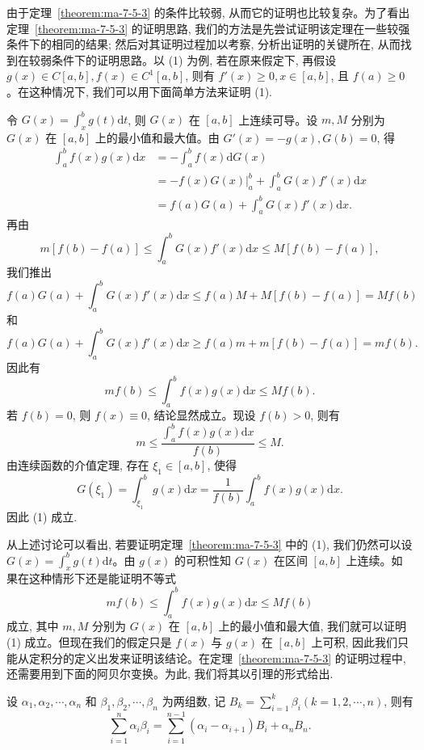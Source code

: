 由于定理~\ref{theorem:ma-7-5-3} 的条件比较弱, 从而它的证明也比较复杂。为了看出定理~\ref{theorem:ma-7-5-3} 的证明思路, 我们的方法是先尝试证明该定理在一些较强条件下的相同的结果; 然后对其证明过程加以考察, 分析出证明的关键所在, 从而找到在较弱条件下的证明思路。以 (1) 为例, 若在原来假定下, 再假设 $g(x)\in C[a,b],f(x)\in C^1[a,b]$, 则有 $f'(x)\geq0,x\in[a,b]$, 且 $f(a)\geq0$。在这种情况下, 我们可以用下面简单方法来证明 (1).

令 $G(x)=\int_x^b g(t)\mathrm dt$, 则 $G(x)$ 在 $[a,b]$ 上连续可导。设 $m,M$ 分别为 $G(x)$ 在 $[a,b]$ 上的最小值和最大值。由 $G'(x)=-g(x),G(b)=0$, 得
\[
\begin{aligned}
  \int_a^b f(x)g(x)\mathrm dx
  &=-\int_a^b f(x)\mathrm dG(x)\\
  &=-\left.f(x)G(x)\right|_a^b+\int_a^b G(x)f'(x)\mathrm dx\\
  &=f(a)G(a)+\int_a^b G(x)f'(x)\mathrm dx.
\end{aligned}
\]
再由
\[
  m[f(b)-f(a)]\leq\int_a^b G(x)f'(x)\mathrm dx\leq M[f(b)-f(a)],
\]
我们推出
\[
  f(a)G(a)+\int_a^b G(x)f'(x)\mathrm dx
  \leq f(a)M+M[f(b)-f(a)]=Mf(b)
\]
和
\[
  f(a)G(a)+\int_a^b G(x)f'(x)\mathrm dx
  \geq f(a)m+m[f(b)-f(a)]=mf(b).
\]
因此有
\[
  mf(b)\leq\int_a^b f(x)g(x)\mathrm dx\leq Mf(b).
\]
若 $f(b)=0$, 则 $f(x)\equiv0$, 结论显然成立。现设 $f(b)>0$, 则有
\[
  m\leq\frac{\int_a^b f(x)g(x)\mathrm dx}{f(b)}\leq M.
\]
由连续函数的介值定理, 存在 $\xi_1\in[a,b]$, 使得
\[
  G(\xi_1)=\int_{\xi_1}^b g(x)\mathrm dx
  =\frac{1}{f(b)}\int_a^b f(x)g(x)\mathrm dx.
\]
因此 (1) 成立.

从上述讨论可以看出, 若要证明定理~\ref{theorem:ma-7-5-3} 中的 (1), 我们仍然可以设 $G(x)=\int_x^b g(t)\mathrm dt$。由 $g(x)$ 的可积性知 $G(x)$ 在区间 $[a,b]$ 上连续。如果在这种情形下还是能证明不等式
\[
  mf(b)\leq\int_a^b f(x)g(x)\mathrm dx\leq Mf(b)
\]
成立, 其中 $m,M$ 分别为 $G(x)$ 在 $[a,b]$ 上的最小值和最大值, 我们就可以证明 (1) 成立。但现在我们的假定只是 $f(x)$ 与 $g(x)$ 在 $[a,b]$ 上可积, 因此我们只能从定积分的定义出发来证明该结论。在定理~\ref{theorem:ma-7-5-3} 的证明过程中, 还需要用到下面的阿贝尔变换。为此, 我们将其以引理的形式给出.

\begin{lemma}[{阿贝尔变换}]\label{lemma:ma-7-5-4}
设 $\alpha_1,\alpha_2,\cdots,\alpha_n$ 和 $\beta_1,\beta_2,\cdots,\beta_n$ 为两组数, 记 $B_k=\sum_{i=1}^k\beta_i(k=1,2,\cdots,n)$, 则有
\[
  \sum_{i=1}^n\alpha_i\beta_i
  =\sum_{i=1}^{n-1}(\alpha_i-\alpha_{i+1})B_i+\alpha_nB_n.
\]
\end{lemma}


